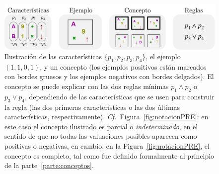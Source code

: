 \begin{figure}
\begin{center}
	\includegraphics[scale=.6]{../figuras/brm/intro_notation_sp.pdf}
\end{center}\caption{Ilustración de las características $\{p_1,p_2,p_3,p_4\}$, el ejemplo $(1,1,0,1)$, y un concepto (los ejemplos positivos están marcados con bordes gruesos y los ejemplos negativos con bordes delgados). El concepto se puede explicar con las dos reglas mínimas $p_1 \land p_2$ o $ p_3 \lor p_4$, dependiendo de las características que se usen para construir la regla (las dos primeras características o las dos últimas características, respectivamente). {\em Cf.}~Figura~\ref{fig:notacionPRE}: en este caso el concepto ilustrado es parcial o {\em indeterminado}, en el sentido de que no todas las valuaciones posibles aparecen como positivas o negativas, en cambio, en la Figura~\ref{fig:notacionPRE}, el concepto es completo, tal como fue definido formalmente al principio de la parte~\ref{parte:conceptos}.}
\label{fig:intro_notation}
\end{figure}



